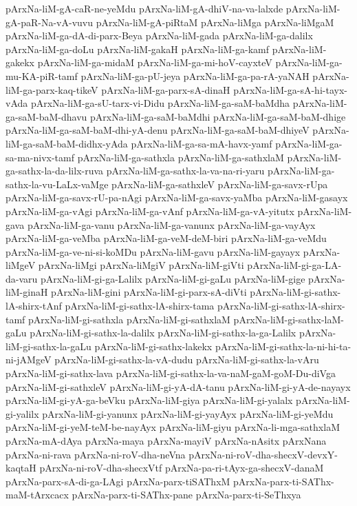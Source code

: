 {pArxNa-liM-gA-caR-ne-yeMdu
pArxNa-liM-gA-dhiV-na-va-lalxde
pArxNa-liM-gA-paR-Na-vA-vuvu
pArxNa-liM-gA-piRtaM
pArxNa-liMga
pArxNa-liMgaM
pArxNa-liM-ga-dA-di-parx-Beya
pArxNa-liM-gada
pArxNa-liM-ga-dalilx
pArxNa-liM-ga-doLu
pArxNa-liM-gakaH
pArxNa-liM-ga-kamf
pArxNa-liM-gakekx
pArxNa-liM-ga-midaM
pArxNa-liM-ga-mi-hoV-cayxteV
pArxNa-liM-ga-mu-KA-piR-tamf
pArxNa-liM-ga-pU-jeya
pArxNa-liM-ga-pa-rA-yaNAH
pArxNa-liM-ga-parx-kaq-tikeV
pArxNa-liM-ga-parx-sA-dinaH
pArxNa-liM-ga-sA-hi-tayx-vAda
pArxNa-liM-ga-sU-tarx-vi-Didu
pArxNa-liM-ga-saM-baMdha
pArxNa-liM-ga-saM-baM-dhavu
pArxNa-liM-ga-saM-baMdhi
pArxNa-liM-ga-saM-baM-dhige
pArxNa-liM-ga-saM-baM-dhi-yA-denu
pArxNa-liM-ga-saM-baM-dhiyeV
pArxNa-liM-ga-saM-baM-didhx-yAda
pArxNa-liM-ga-sa-mA-havx-yamf
pArxNa-liM-ga-sa-ma-nivx-tamf
pArxNa-liM-ga-sathxla
pArxNa-liM-ga-sathxlaM
pArxNa-liM-ga-sathx-la-da-lilx-ruva
pArxNa-liM-ga-sathx-la-va-na-ri-yaru
pArxNa-liM-ga-sathx-la-vu-LaLx-vaMge
pArxNa-liM-ga-sathxleV
pArxNa-liM-ga-savx-rUpa
pArxNa-liM-ga-savx-rU-pa-nAgi
pArxNa-liM-ga-savx-yaMba
pArxNa-liM-gasayx
pArxNa-liM-ga-vAgi
pArxNa-liM-ga-vAnf
pArxNa-liM-ga-vA-yitutx
pArxNa-liM-gava
pArxNa-liM-ga-vanu
pArxNa-liM-ga-vanunx
pArxNa-liM-ga-vayAyx
pArxNa-liM-ga-veMba
pArxNa-liM-ga-veM-deM-biri
pArxNa-liM-ga-veMdu
pArxNa-liM-ga-ve-ni-si-koMDu
pArxNa-liM-gavu
pArxNa-liM-gayayx
pArxNa-liMgeV
pArxNa-liMgi
pArxNa-liMgiV
pArxNa-liM-giVti
pArxNa-liM-gi-ga-LA-da-varu
pArxNa-liM-gi-ga-Lalilx
pArxNa-liM-gi-gaLu
pArxNa-liM-gige
pArxNa-liM-ginaH
pArxNa-liM-gini
pArxNa-liM-gi-parx-sA-diVti
pArxNa-liM-gi-sathx-lA-shirx-tAnf
pArxNa-liM-gi-sathx-lA-shirx-tama
pArxNa-liM-gi-sathx-lA-shirx-tamf
pArxNa-liM-gi-sathxla
pArxNa-liM-gi-sathxlaM
pArxNa-liM-gi-sathx-laM-gaLu
pArxNa-liM-gi-sathx-la-dalilx
pArxNa-liM-gi-sathx-la-ga-Lalilx
pArxNa-liM-gi-sathx-la-gaLu
pArxNa-liM-gi-sathx-lakekx
pArxNa-liM-gi-sathx-la-ni-hi-ta-ni-jAMgeV
pArxNa-liM-gi-sathx-la-vA-dudu
pArxNa-liM-gi-sathx-la-vAru
pArxNa-liM-gi-sathx-lava
pArxNa-liM-gi-sathx-la-va-naM-gaM-goM-Du-diVga
pArxNa-liM-gi-sathxleV
pArxNa-liM-gi-yA-dA-tanu
pArxNa-liM-gi-yA-de-nayayx
pArxNa-liM-gi-yA-ga-beVku
pArxNa-liM-giya
pArxNa-liM-gi-yalalx
pArxNa-liM-gi-yalilx
pArxNa-liM-gi-yanunx
pArxNa-liM-gi-yayAyx
pArxNa-liM-gi-yeMdu
pArxNa-liM-gi-yeM-teM-be-nayAyx
pArxNa-liM-giyu
pArxNa-li-mga-sathxlaM
pArxNa-mA-dAya
pArxNa-maya
pArxNa-mayiV
pArxNa-nAsitx
pArxNana
pArxNa-ni-rava
pArxNa-ni-roV-dha-neVna
pArxNa-ni-roV-dha-shecxV-devxY-kaqtaH
pArxNa-ni-roV-dha-shecxVtf
pArxNa-pa-ri-tAyx-ga-shecxV-danaM
pArxNa-parx-sA-di-ga-LAgi
pArxNa-parx-tiSAThxM
pArxNa-parx-ti-SAThx-maM-tArxcacx
pArxNa-parx-ti-SAThx-pane
pArxNa-parx-ti-SeThxya
}

